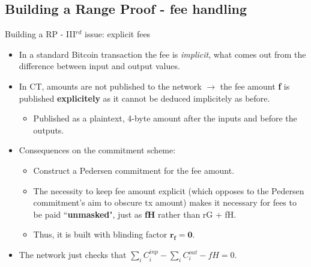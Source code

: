 \documentclass[10.5pt,compress]{beamer}
\begin{document}
\subsection{Building a Range Proof - fee handling}
\begin{frame}{Building a RP - III$^{rd}$ issue: explicit fees}
    \begin{itemize}
        \item In a standard Bitcoin transaction the fee is \textit{implicit}, what comes out from the difference between input and output values.
        \item In CT, amounts are not published to the network $\rightarrow$ the fee amount \textbf{f} is published \textbf{explicitely} as it cannot be deduced implicitely as before.
        \begin{itemize}
            \item Published as a plaintext, 4-byte amount after the inputs and before the outputs.
        \end{itemize}
        \item Consequences on the commitment scheme:
        \begin{itemize}
            \item Construct a Pedersen commitment for the fee amount. %
            \item The necessity to keep fee amount explicit (which opposes to the Pedersen commitment's aim to obscure tx amount) makes it necessary for fees to be paid ``\textbf{unmasked}", just as \textbf{fH} rather than rG + fH. %
            \item Thus, it is built with blinding factor $\boldsymbol{r_f = 0}$.
        \end{itemize}
        \item The network just checks that $\sum_{i}C_i^{inp} - \sum_{i}C_i^{out} - fH = 0$.
    \end{itemize}
\end{frame}
\end{document}
